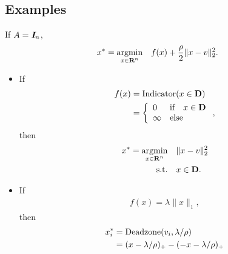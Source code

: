 \documentclass{article}
\begin{document}
\subsection{Examples}
    If $A=\emph{\textbf{I}}_n$,
    \begin{align*}
        x^* = \underset{x\in\textbf{R}^n}{\text{argmin}}\quad f(x)+\frac{\rho}{2}\|x-v\|_2^2.
    \end{align*}

    \begin{itemize}
        \item If 
        \begin{align*}
            f(x)&=\text{Indicator}(x\in\textbf{D})\\
            &=\left\{ \begin{array}{lllllllllllllllllll}
                    0 & \text{if}\quad x\in\textbf{D}\\
                    \infty & \text{else}
                \end{array}\right.,
        \end{align*}
        then
            \begin{align*}
                x^*=\underset{x\in\textbf{R}^n}{\text{argmin}}\quad &\|x-v\|_2^2\\
                \text{s.t.} \quad &x\in\textbf{D}.
            \end{align*}
        \item If
            \begin{align*}
                f(x)=\lambda\|x\|_1,
            \end{align*}
            then
            \begin{align*}
                x^*_i &= \text{Deadzone}(v_i,\lambda/\rho)\\
                    &=(x-\lambda/\rho)_+-(-x-\lambda/\rho)_+
            \end{align*}


\end{itemize}
\end{document}
